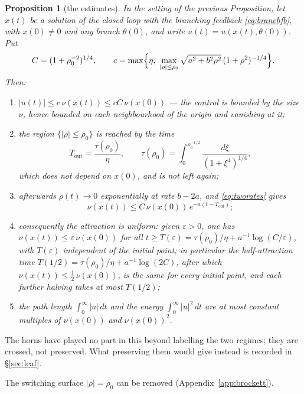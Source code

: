 \documentclass[11pt,reqno]{amsart}
\theoremstyle{plain}
\newtheorem*{proposition}{Proposition}
\theoremstyle{definition}
\theoremstyle{remark}
\begin{document}
\begin{proposition}[the estimates]
In the setting of the previous Proposition, let $x(t)$ be a solution of the
closed loop with the branching feedback \eqref{eq:branchfb}, with $x(0)\neq0$ and any branch $\theta(0)$,
and write $u(t)=u(x(t),\theta(0))$. Put
\[
  C=(1+\rho_0^{-2})^{1/4},\qquad
  c=\max\Bigl\{\eta,\ \max_{|\rho|\le\rho_0}\sqrt{a^{2}+b^{2}\rho^{2}}\,(1+\rho^{2})^{-1/4}\Bigr\}.
\]
Then:
\begin{enumerate}
\item[\textup{(i)}] $|u(t)|\le c\,\nu(x(t))\le cC\,\nu(x(0))$ --- the control is bounded by
      the size $\nu$, hence bounded on each neighbourhood of the origin and vanishing
      at it;
\item[\textup{(ii)}] the region $\{|\rho|\le\rho_0\}$ is reached by the time
      \begin{equation}\label{eq:entrytime}
        T_{\mathrm{out}}=\frac{\tau(\rho_0)}{\eta},\qquad
        \tau(\rho_0)=\int_0^{\rho_0^{-1/2}}\frac{d\xi}{(1+\xi^{4})^{1/4}} ,
      \end{equation}
      which does not depend on $x(0)$, and is not left again;
\item[\textup{(iii)}] afterwards $\rho(t)\to0$ exponentially at rate $b-2a$, and
      \eqref{eq:tworates} gives
      \[
        \nu(x(t))\le C\,\nu(x(0))\,e^{-a(t-T_{\mathrm{out}})};
      \]
\item[\textup{(iv)}] consequently the attraction is uniform: given
      $\varepsilon>0$, one has
      $\nu(x(t))\le\varepsilon\,\nu(x(0))$ for all
      $t\ge T(\varepsilon)=\tau(\rho_0)/\eta+a^{-1}\log(C/\varepsilon)$, with
      $T(\varepsilon)$ independent of the initial point; in particular the
      \emph{half-attraction time} $T(1/2)=\tau(\rho_0)/\eta+a^{-1}\log(2C)$, after which
      $\nu(x(t))\le\frac12\,\nu(x(0))$, is the same for every initial point, and each
      further halving takes at most $T(1/2)$;
\item[\textup{(v)}] the path length $\int_0^\infty|u|\,dt$ and the energy
      $\int_0^\infty|u|^{2}\,dt$ are at most constant multiples of $\nu(x(0))$ and
      $\nu(x(0))^{2}$.
\end{enumerate}
\end{proposition}

The horns have played no part in this beyond labelling the two regimes; they are
crossed, not preserved. What preserving them would give instead is recorded in
\S\ref{sec:leaf}.


The switching surface $|\rho|=\rho_0$ can be removed (Appendix~\ref{app:brockett}).
\end{document}
